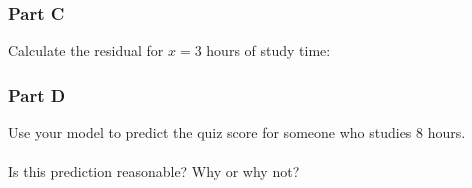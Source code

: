 \documentclass[12pt]{article}
\begin{document}
				\vspace{6cm}

			\subsubsection*{Part C}
				
				Calculate the residual for $x = 3$ hours of study time:

				\vspace{5cm}

			\subsubsection*{Part D}
				
				Use your model to predict the quiz score for someone who studies 8 hours.\\\\
                Is this prediction reasonable? Why or why not?
	
\end{document}
